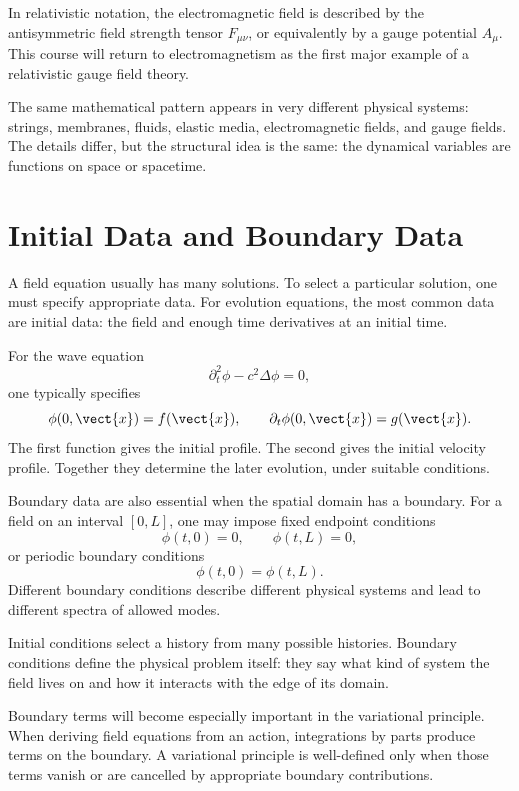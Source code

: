 In relativistic notation, the electromagnetic field is described by the
antisymmetric field strength tensor \(F_{\mu\nu}\), or equivalently by a gauge
potential \(A_\mu\). This course will return to electromagnetism as the first
major example of a relativistic gauge field theory.

\begin{examplebox}
The same mathematical pattern appears in very different physical systems:
strings, membranes, fluids, elastic media, electromagnetic fields, and gauge
fields. The details differ, but the structural idea is the same: the dynamical
variables are functions on space or spacetime.
\end{examplebox}

\section{Initial Data and Boundary Data}

A field equation usually has many solutions. To select a particular solution,
one must specify appropriate data. For evolution equations, the most common data
are initial data: the field and enough time derivatives at an initial time.

For the wave equation
\[
    \partial_t^2\phi - c^2\Delta\phi = 0,
\]
one typically specifies
\[
    \phi(0,\vect{x}) = f(\vect{x}),
    \qquad
    \partial_t\phi(0,\vect{x}) = g(\vect{x}).
\]
The first function gives the initial profile. The second gives the initial
velocity profile. Together they determine the later evolution, under suitable
conditions.

Boundary data are also essential when the spatial domain has a boundary. For a
field on an interval \([0,L]\), one may impose fixed endpoint conditions
\[
    \phi(t,0)=0,
    \qquad
    \phi(t,L)=0,
\]
or periodic boundary conditions
\[
    \phi(t,0)=\phi(t,L).
\]
Different boundary conditions describe different physical systems and lead to
different spectra of allowed modes.

\begin{remarkbox}
Initial conditions select a history from many possible histories. Boundary
conditions define the physical problem itself: they say what kind of system the
field lives on and how it interacts with the edge of its domain.
\end{remarkbox}

Boundary terms will become especially important in the variational principle.
When deriving field equations from an action, integrations by parts produce
terms on the boundary. A variational principle is well-defined only when those
terms vanish or are cancelled by appropriate boundary contributions.

